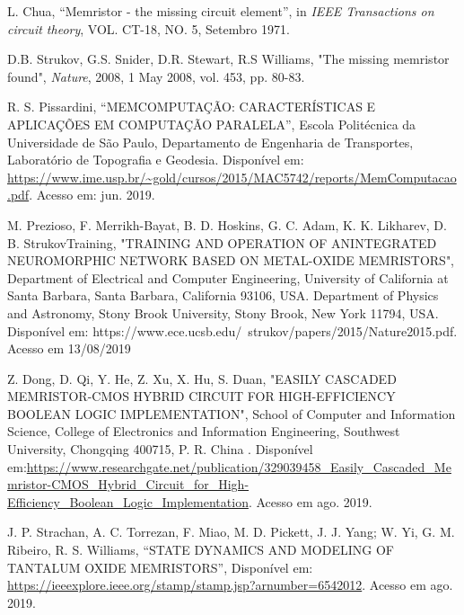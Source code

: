 \documentclass{ceel}
\begin{document}
\begin{multicols}{2}
\begin{thebibliography}{9}
    L. Chua,
    “Memristor - the missing circuit element”, 
    in \emph{IEEE Transactions on circuit theory}, VOL. CT-18, NO. 5, Setembro 1971.

     D.B. Strukov, G.S. Snider, D.R. Stewart,  R.S Williams, 
"The missing memristor found", 
\emph{Nature}, 2008, 1 May 2008, vol. 453, pp. 80-83.

    R. S. Pissardini,
    “MEMCOMPUTAÇÃO: CARACTERÍSTICAS E APLICAÇÕES EM
COMPUTAÇÃO PARALELA”, Escola Politécnica da Universidade de São Paulo, Departamento de Engenharia de Transportes, Laboratório de Topografia e Geodesia.
 Disponível em:
 \url{https://www.ime.usp.br/~gold/cursos/2015/MAC5742/reports/MemComputacao.pdf}. Acesso em: jun. 2019.
 
   M. Prezioso, F. Merrikh-Bayat, B. D. Hoskins, G. C. Adam, K. K. Likharev, D. B. StrukovTraining, "\uppercase{Training and operation of anintegrated neuromorphic
network based on metal-oxide memristors}", 
Department of Electrical and Computer Engineering, University of California at Santa Barbara, Santa Barbara, California 93106, USA. 
Department of Physics and Astronomy, Stony Brook University,
Stony Brook, New York 11794, USA. Disponível em: https://www.ece.ucsb.edu/~strukov/papers/2015/Nature2015.pdf. Acesso em 13/08/2019

    Z. Dong, D. Qi, Y. He, Z. Xu, X. Hu, S. Duan, "\uppercase{Easily Cascaded Memristor-CMOS Hybrid Circuit
for High-Efficiency Boolean Logic Implementation}", School of Computer and Information Science,
College of Electronics and Information Engineering,
Southwest University, Chongqing 400715, P. R. China . Disponível em:\url{https://www.researchgate.net/publication/329039458\_Easily\_Cascaded\_Memristor-CMOS\_Hybrid\_Circuit\_for\_High-Efficiency\_Boolean\_Logic\_Implementation}. Acesso em ago. 2019.

    J. P. Strachan, A. C. Torrezan, F. Miao, M. D. Pickett, J. J. Yang; W. Yi, G. M. Ribeiro, R. S. Williams, “STATE DYNAMICS AND MODELING OF TANTALUM OXIDE MEMRISTORS”, Disponível em: \url{https://ieeexplore.ieee.org/stamp/stamp.jsp?arnumber=6542012}. Acesso em ago. 2019.
 

\end{thebibliography}
\end{multicols}
\end{document}
